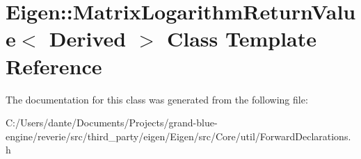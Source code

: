 \hypertarget{class_eigen_1_1_matrix_logarithm_return_value}{}\section{Eigen\+::Matrix\+Logarithm\+Return\+Value$<$ Derived $>$ Class Template Reference}
\label{class_eigen_1_1_matrix_logarithm_return_value}


The documentation for this class was generated from the following file\+:\begin{DoxyCompactItemize}
\item 
C\+:/\+Users/dante/\+Documents/\+Projects/grand-\/blue-\/engine/reverie/src/third\+\_\+party/eigen/\+Eigen/src/\+Core/util/Forward\+Declarations.\+h\end{DoxyCompactItemize}
